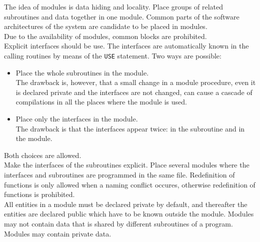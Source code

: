 \documentclass[12pt]{book}
\begin{document}
The idea of modules is data hiding and locality. Place groups of related subroutines and data
together in one module. Common parts of the software architectures of the system are candidate
to be placed in modules.
\\[2ex]
\noindent
Due to the availability of modules, common blocks are prohibited.
\\[2ex]
\noindent
Explicit interfaces should be use. The interfaces are automatically known in the calling routines
by means of the {\tt USE} statement. Two ways are possible:
\begin{itemize}
  \item Place the whole subroutines in the module.\\
        The drawback is, however, that a small change in a module procedure, even it is declared
        private and the interfaces are not changed, can cause a cascade of compilations in all
        the places where the module is used.
  \item Place only the interfaces in the module.\\
        The drawback is that the interfaces appear twice: in the subroutine and in the module.
\end{itemize}
Both choices are allowed.
\\[2ex]
\noindent
Make the interfaces of the subroutines explicit. Place several modules where the interfaces and subroutines
are programmed in the same file. Redefinition of functions is only allowed when a naming conflict
occures, otherwise redefinition of functions is prohibited.
\\[2ex]
\noindent
All entities in a module must be declared private by default, and thereafter the entities are declared
public which have to be known outside the module. Modules may not contain data that is shared by
different subroutines of a program. Modules may contain private data.
\\[2ex]
\noindent

 \label{ch:layout}
\end{document}
